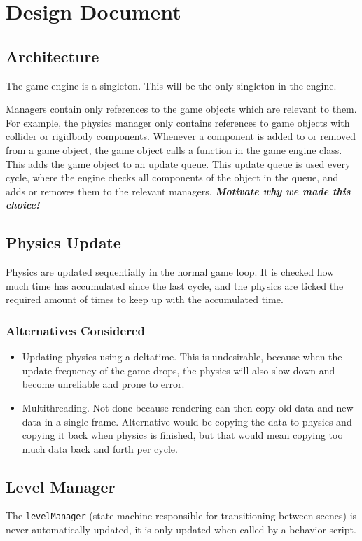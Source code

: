 \documentclass{article}
\begin{document}
\section*{Design Document}

\subsection{Architecture}
The game engine is a singleton. This will be the only singleton in the engine.

Managers contain only references to the game objects which are relevant to them. For example, the physics manager only contains references to game objects with collider or rigidbody components.
Whenever a component is added to or removed from a game object, the game object calls a function in the game engine class. This adds the game object to an update queue. This update queue is used every cycle, where the engine checks all components of the object in the queue, and adds or removes them to the relevant managers.
\textbf{\textit{Motivate why we made this choice!}}

\subsection{Physics Update}
Physics are updated sequentially in the normal game loop. It is checked how much time has accumulated since the last cycle, and the physics are ticked the required amount of times to keep up with the accumulated time.

\subsubsection{Alternatives Considered}
\begin{itemize}
  \item Updating physics using a deltatime. This is undesirable, because when the update frequency of the game drops, the physics will also slow down and become unreliable and prone to error.
  \item Multithreading. Not done because rendering can then copy old data and new data in a single frame. Alternative would be copying the data to physics and copying it back when physics is finished, but that would mean copying too much data back and forth per cycle.
\end{itemize}

\subsection{Level Manager}
The \texttt{levelManager} (state machine responsible for transitioning between scenes) is never automatically updated, it is only updated when called by a behavior script.
\end{document}
